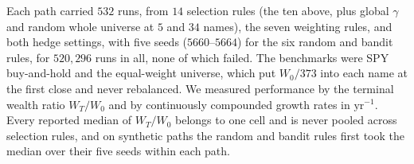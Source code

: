 Each path carried $532$ runs, from $14$ selection rules (the ten above, plus global $\gamma$ and random whole universe
at $5$ and $34$ names), the seven weighting rules, and both hedge settings, with five seeds ($5660$--$5664$) for the
six random and bandit rules, for $520{,}296$ runs in all, none of which failed. The benchmarks were SPY buy-and-hold
and the equal-weight universe, which put $W_0/373$ into each name at the first close and never rebalanced. We
measured performance by the terminal wealth ratio $W_T/W_0$ and by continuously compounded growth rates in
$\mathrm{yr}^{-1}$. Every reported median of $W_T/W_0$ belongs to one cell and is never pooled across selection
rules, and on synthetic paths the random and bandit rules first took the median over their five seeds within each
path.

